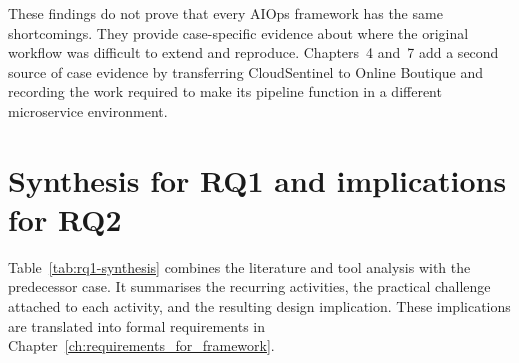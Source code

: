 These findings do not prove that every AIOps framework has the same shortcomings. They provide case-specific evidence about where the original workflow was difficult to extend and reproduce. Chapters~4 and~7 add a second source of case evidence by transferring CloudSentinel to Online Boutique and recording the work required to make its pipeline function in a different microservice environment.

\section{Synthesis for RQ1 and implications for RQ2}

Table~\ref{tab:rq1-synthesis} combines the literature and tool analysis with the predecessor case. It summarises the recurring activities, the practical challenge attached to each activity, and the resulting design implication. These implications are translated into formal requirements in Chapter~\ref{ch:requirements_for_framework}.

